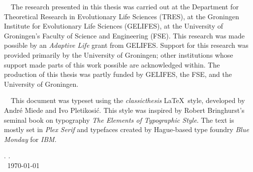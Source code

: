 \thispagestyle{empty}

\hfill

\vfill


\noindent \adftripleflourishright~~The research presented in this thesis was carried out at the Department for Theoretical Research in Evolutionary Life Sciences (TRES), at the Groningen Institute for Evolutionary Life Sciences (GELIFES), at the University of Groningen's Faculty of Science and Engineering (FSE).
This research was made possible by an \emph{Adaptive Life} grant from GELIFES.
Support for this research was provided primarily by the University of Groningen; other institutions whose support made parts of this work possible are acknowledged within.
The production of this thesis was partly funded by GELIFES, the FSE, and the University of Groningen.

\medskip

\noindent \adftripleflourishright~~This document was typeset using the \emph{classicthesis} \LaTeX~style, developed by Andr\'e Miede and Ivo Pletikosić.
This style was inspired by Robert Bringhurst's seminal book on typography \emph{The Elements of Typographic Style}.
The text is mostly set in \emph{Plex Serif} and \emph{} typefaces created by Hague-based type foundry \emph{Blue Monday} for \emph{IBM}.

\bigskip

\noindent\finalVersionString

\noindent\myName. \textit{\myTitle.}%
\\
\noindent \textcopyright\ \today
